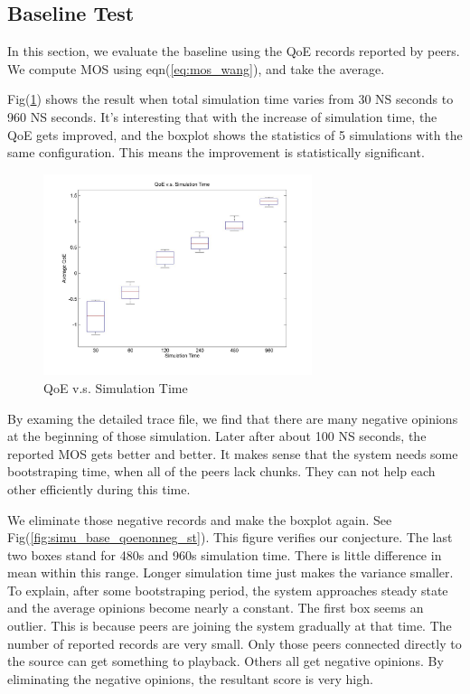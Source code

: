 \documentclass[11pt,a4paper]{article}
\begin{document}
\subsection{Baseline Test}
\label{sec:simu_base}

In this section, we evaluate the baseline using the QoE records 
reported by peers. We compute MOS using eqn(\ref{eq:mos_wang}),
and take the average. 

Fig(\ref{fig:simu_base_qoe_st}) shows the result when total simulation 
time varies from 30 NS seconds to 960 NS seconds. It's interesting that
with the increase of simulation time, the QoE gets improved, and the 
boxplot shows the statistics of 5 simulations with the same 
configuration. This means the improvement is statistically significant. 

\begin{figure}[htb]
\centering
	\includegraphics[width=0.7\textwidth]{../fig/simutime_qoe.jpg}
	\caption{QoE v.s. Simulation Time}
	\label{fig:simu_base_qoe_st}
\end{figure}

By examing the detailed trace file, we find that there are many 
negative opinions at the beginning of those simulation. Later after
about 100 NS seconds, the reported MOS gets better and better. It
makes sense that the system needs some bootstraping time, when 
all of the peers lack chunks. They can not help each other efficiently
during this time. 

We eliminate those negative records and make the boxplot again. See 
Fig(\ref{fig:simu_base_qoenonneg_st}). This figure verifies our 
conjecture. The last two boxes stand for 480s and 960s simulation time. 
There is little difference in mean within this range. Longer simulation time
just makes the variance smaller. To explain, after some bootstraping period, 
the system approaches steady state and the average opinions become 
nearly a constant. The first box seems an outlier. This is because peers are
joining the system gradually at that time. The number of reported records
are very small. Only those peers connected directly to the source can 
get something to playback. Others all get negative opinions. By eliminating 
the negative opinions, the resultant score is very high. 
\end{document}
